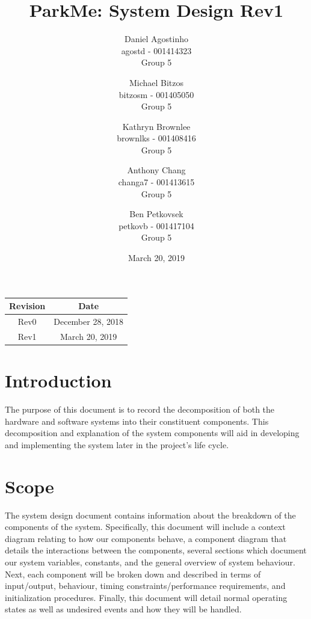 \documentclass[]{article}
\title{ParkMe: System Design Rev1}
\author{Daniel Agostinho\\agostd - 001414323\\ Group 5 \and Michael Bitzos\\bitzosm - 001405050\\ Group 5 \and Kathryn Brownlee\\brownlks - 001408416\\ Group 5  \and Anthony Chang\\changa7 - 001413615\\ Group 5 \and Ben Petkovsek\\petkovb - 001417104\\ Group 5}
\begin{document}
	\date{March 20, 2019}
	\maketitle
	\begin{center}
		\begin{table}[b]
			\centering
			\begin{tabular}{|c|c|}
				\hline
				Revision & Date \\ 
				\hline
				Rev0 & December 28, 2018 \\ 
				Rev1 & March 20, 2019 \\ 
				\hline
			\end{tabular}
		\end{table}
	\end{center}
	\newpage
	\tableofcontents
	\newpage
	\listoffigures
	\listoftables
	\newpage
	
	\captionsetup{font=bf}
	
	\section{Introduction}
	The purpose of this document is to record the decomposition of both the hardware and software systems into their constituent components. This decomposition and explanation of the system components will aid in developing and implementing the system later in the project’s life cycle.
	
	\section{Scope}
	The system design document contains information about the breakdown of the components of the system. Specifically, this document will include a context diagram relating to how our components behave, a component diagram that details the interactions between the components, several sections which document our system variables, constants, and the general overview of system behaviour. Next, each component will be broken down and described in terms of input/output, behaviour, timing constraints/performance requirements, and initialization procedures. Finally, this document will detail normal operating states as well as undesired events and how they will be handled.
	
	\graphicspath{ {./Images/} }
\end{document}

